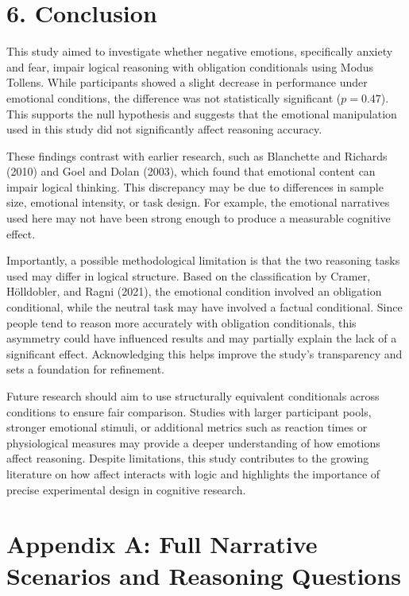 \documentclass[12pt]{article}
\begin{document}
\section*{6. Conclusion}

This study aimed to investigate whether negative emotions, specifically anxiety and fear, impair logical reasoning with obligation conditionals using Modus Tollens. While participants showed a slight decrease in performance under emotional conditions, the difference was not statistically significant ($p = 0.47$). This supports the null hypothesis and suggests that the emotional manipulation used in this study did not significantly affect reasoning accuracy.

These findings contrast with earlier research, such as Blanchette and Richards (2010) and Goel and Dolan (2003), which found that emotional content can impair logical thinking. This discrepancy may be due to differences in sample size, emotional intensity, or task design. For example, the emotional narratives used here may not have been strong enough to produce a measurable cognitive effect.

Importantly, a possible methodological limitation is that the two reasoning tasks used may differ in logical structure. Based on the classification by Cramer, Hölldobler, and Ragni (2021), the emotional condition involved an obligation conditional, while the neutral task may have involved a factual conditional. Since people tend to reason more accurately with obligation conditionals, this asymmetry could have influenced results and may partially explain the lack of a significant effect. Acknowledging this helps improve the study's transparency and sets a foundation for refinement.

Future research should aim to use structurally equivalent conditionals across conditions to ensure fair comparison. Studies with larger participant pools, stronger emotional stimuli, or additional metrics such as reaction times or physiological measures may provide a deeper understanding of how emotions affect reasoning. Despite limitations, this study contributes to the growing literature on how affect interacts with logic and highlights the importance of precise experimental design in cognitive research.




\appendix
\section*{Appendix A: Full Narrative Scenarios and Reasoning Questions}
\end{document}

